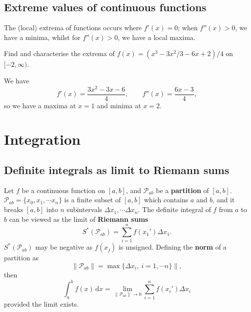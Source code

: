\documentclass[letter-paper]{tufte-book}
\newenvironment{example}[1][Example]{\begin{trivlist}
\item[\hskip \labelsep {\bfseries #1}]}{\end{trivlist}}
\newcommand\Def[1]{\textbf{#1}}
\begin{document}

\section{Extreme values of continuous functions}

The (local) extrema of functions occurs where $f'(x)=0$; when $f''(x)>0$, we
have a minima, whilst for $f''(x)>0$, we have a local maxima.

\begin{example}
  Find and characterise the extrema of $f(x)=(x^3 - 3x^2/3 - 6x +2)/4$ on
  $[-2,\infty)$.
  
  We have
  \begin{equation*}
    f'(x)=\frac{3x^2 -3x-6}{4},\qquad f''(x)=\frac{6x-3}{4},
  \end{equation*}
  so we have a maxima at $x=1$ and minima at $x=2$.
\end{example}


\chapter{Integration}


\section{Definite integrals as limit to Riemann sums}

Let $f$ be a continuous function on $[a,b]$, and $\mathcal{P}_{ab}$ be a
\Def{partition} of $[a,b]$. $\mathcal{P}_{ab}=\{x_0, x_1,\cdots x_n\}$ is
a finite subset of $[a,b]$ which contains $a$ and $b$, and it breaks $[a,b]$
into $n$ subintervals $\Delta x_1,\cdots\Delta x_n$. The definite integral of
$f$ from $a$ to $b$ can be viewed as the limit of \Def{Riemann sums}
\begin{equation*}
  S^*(\mathcal{P}_{ab})=\sum_{i=1}^n f(x_1')\Delta x_1.
\end{equation*}
$S^*(\mathcal{P}_{ab})$ may be negative as $f(x_j)$ is unsigned. Defining the
\Def{norm} of a partition as
\begin{equation*}
  \|\mathcal{P}_{ab}\|=\max\{\Delta x_i,\ i=1,\cdots n\}\|,
\end{equation*}
then
\begin{equation*}
  \int_a^b f(x)\, \mathrm{d}x=\lim_{\|\mathcal{P}_{ab}\|\to 0}
  \sum_{i=1}^n f(x_i')\Delta x_i
\end{equation*}
provided the limit exists.
\end{document}
